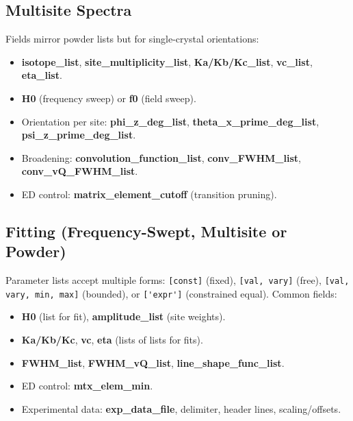 \documentclass[12pt]{article}
\begin{document}
\subsection{Multisite Spectra}
Fields mirror powder lists but for single-crystal orientations:
\begin{itemize}
  \item \textbf{isotope\_list}, \textbf{site\_multiplicity\_list}, \textbf{Ka/Kb/Kc\_list}, \textbf{vc\_list}, \textbf{eta\_list}.
  \item \textbf{H0} (frequency sweep) or \textbf{f0} (field sweep).
  \item Orientation per site: \textbf{phi\_z\_deg\_list}, \textbf{theta\_x\_prime\_deg\_list}, \textbf{psi\_z\_prime\_deg\_list}.
  \item Broadening: \textbf{convolution\_function\_list}, \textbf{conv\_FWHM\_list}, \textbf{conv\_vQ\_FWHM\_list}.
  \item ED control: \textbf{matrix\_element\_cutoff} (transition pruning).
\end{itemize}

\subsection{Fitting (Frequency-Swept, Multisite or Powder)}
Parameter lists accept multiple forms: \verb|[const]| (fixed), \verb|[val, vary]| (free), \verb|[val, vary, min, max]| (bounded), or \verb|['expr']| (constrained equal). Common fields:
\begin{itemize}
  \item \textbf{H0} (list for fit), \textbf{amplitude\_list} (site weights).
  \item \textbf{Ka/Kb/Kc}, \textbf{vc}, \textbf{eta} (lists of lists for fits).
  \item \textbf{FWHM\_list}, \textbf{FWHM\_vQ\_list}, \textbf{line\_shape\_func\_list}.
  \item ED control: \textbf{mtx\_elem\_min}.
  \item Experimental data: \textbf{exp\_data\_file}, delimiter, header lines, scaling/offsets.
\end{itemize}
\end{document}
